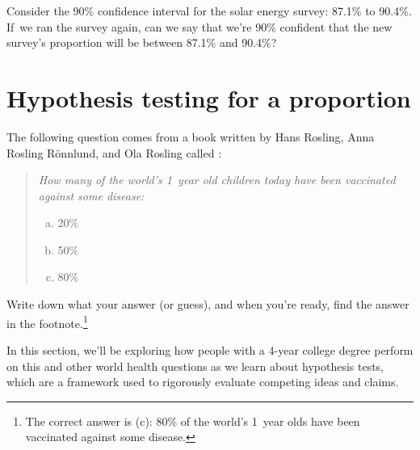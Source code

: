 \begin{exercisewrap}
\begin{nexercise}
Consider the 90\% confidence interval for the solar
energy survey: 87.1\% to 90.4\%.
If~we ran the survey again, can we say that we're
90\% confident that the new survey's proportion
will be between 87.1\% and 90.4\%?\footnotemark{}
\end{nexercise}
\end{exercisewrap}








{}






\section{Hypothesis testing for a proportion}
\label{hypothesisTesting}


The following question comes from a book written by
Hans Rosling, Anna Rosling R{\"o}nnlund, and Ola Rosling
called \emph{}:
\begin{quote}
  {\em How many of the world's 1~year old children today
  have been vaccinated against some disease:
  \begin{enumerate}[a.]
  \setlength{\itemsep}{0mm}
  \item 20\%
  \item 50\%
  \item 80\%
  \end{enumerate}}
\end{quote}
Write down what your answer (or guess),
and when you're ready, find the answer in the
footnote.\footnote{The correct answer is (c):
  80\% of the world's 1~year olds have been vaccinated
  against some disease.}

In this section,
we'll be exploring how people with a 4-year college
degree perform on this and other world health questions
as we learn about hypothesis tests, which are
a framework used to rigorously evaluate competing
ideas and claims.

